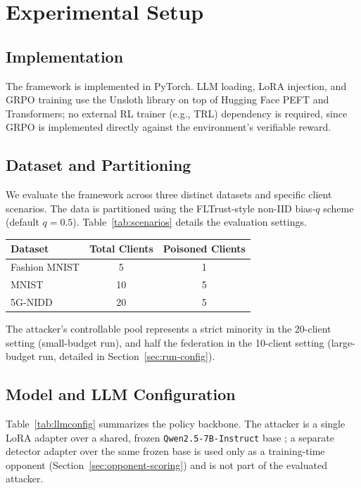 \documentclass[conference,9pt]{IEEEtran}
\begin{document}
\section{Experimental Setup}
\label{sec:setup}

\subsection{Implementation}
The framework is implemented in PyTorch. LLM loading, LoRA injection, and GRPO training use the Unsloth library on top of Hugging Face PEFT and Transformers; no external RL trainer (e.g., TRL) dependency is required, since GRPO is implemented directly against the environment's verifiable reward.

\subsection{Dataset and Partitioning}
We evaluate the framework across three distinct datasets and specific client scenarios. The data is partitioned using the FLTrust-style non-IID bias-$q$ scheme \cite{fltrust} (default $q=0.5$). Table~\ref{tab:scenarios} details the evaluation settings.

\begin{center}
\label{tab:scenarios}
\small
\begin{tabular}{@{}lcc@{}}
\toprule
\textbf{Dataset} & \textbf{Total Clients} & \textbf{Poisoned Clients} \\
\midrule
Fashion MNIST & 5 & 1 \\
MNIST & 10 & 5 \\
5G-NIDD & 20 & 5 \\
\bottomrule
\end{tabular}
\end{center}

The attacker's controllable pool represents a strict minority in the 20-client setting (small-budget run), and half the federation in the 10-client setting (large-budget run, detailed in Section~\ref{sec:run-config}).

\subsection{Model and LLM Configuration}
Table~\ref{tab:llmconfig} summarizes the policy backbone. The attacker is a single LoRA adapter over a shared, frozen \texttt{Qwen2.5-7B-Instruct} base \cite{lora2022}; a separate detector adapter over the same frozen base is used only as a training-time opponent (Section~\ref{sec:opponent-scoring}) and is not part of the evaluated attacker.
\end{document}
